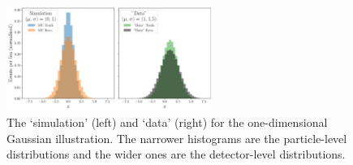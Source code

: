 \documentclass[NOTE, atlasdraft=true, texlive=2016, UKenglish]{\ATLASLATEXPATH atlasdoc}
\begin{document}
\begin{figure}[h!]
\centering
\includegraphics[width=0.6\textwidth]{Figures/GaussianToyExample/GaussianToyExample-Distributions.pdf}
\caption{The `simulation' (left) and `data' (right) for the one-dimensional Gaussian illustration.  The narrower histograms are the particle-level distributions and the wider ones are the detector-level distributions.}
\label{fig:gaussian:inputs}
\end{figure}
\end{document}
